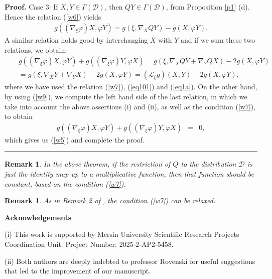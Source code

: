 \documentclass{article}
\newtheorem{remark}[theorem]{Remark}
\newenvironment{proof}[1][Proof]{\noindent\textbf{#1.} }{\ \rule{0.5em}{0.5em}}
\begin{document}
\begin{proof}
	\noindent Case 3: If $X,Y\in\Gamma(\mathcal{D})$, then $QY\in\Gamma(\mathcal{D})$, from Proposition \ref{p1} (d). Hence the relation (\ref{w6}) yields 
\begin{eqnarray*}
		g((\nabla_{\xi}\varphi)X,\varphi Y)=g(\xi,\nabla_XQY)-g(X,\varphi Y).
\end{eqnarray*}
A similar relation holds good by interchanging $X$ with $Y$ and if we sum these two relations, we obtain:
\begin{eqnarray*}
		&&g((\nabla_{\xi}\varphi)X,\varphi Y)+g((\nabla_{\xi}\varphi)Y,\varphi X)=g(\xi,\nabla_XQY+\nabla_YQX)-2g(X,\varphi Y)\\
		&&=g(\xi,\nabla_XY+\nabla_YX)-2g(X,\varphi Y)=(\mathcal{L}_{\xi}g)(X,Y)-2g(X,\varphi Y),
\end{eqnarray*}	
where we have used the relation	(\ref{w7}), (\ref{eq101}) and (\ref{eq1a}). On the other hand, by using (\ref{w9}), we compute the left hand side of the last relation, in which we take into account the above assertions (i) and (ii), as well as the condition (\ref{w7}), to obtain 
\begin{eqnarray*}
	g((\nabla_{\xi}\varphi)X,\varphi Y)+g((\nabla_{\xi}\varphi)Y,\varphi X)&=& 0,
\end{eqnarray*}
which gives us (\ref{w5}) and complete the proof.
\end{proof}

\begin{remark}
	In the above theorem, if the restriction of $Q$ to the distribution $\mathcal{D}$ is just the identity map up to a multiplicative function, then that function should be constant, based on the condition (\ref{w7}).
\end{remark}

\begin{remark}
 As in Remark 2 of \cite{Rov56}, the condition (\ref{w7}) can be relaxed.
\end{remark}\medskip






\noindent \textbf{{Acknowledgements}}\medskip

\noindent (i) This work is supported by Mersin University Scientific Research Projects Coordination Unit. Project Number: 2025-2-AP2-5458.\smallskip

\noindent (ii) Both authors are deeply indebted to professor Rovenski for useful suggestions that led to the improvement of our manuscript.
\end{document}
